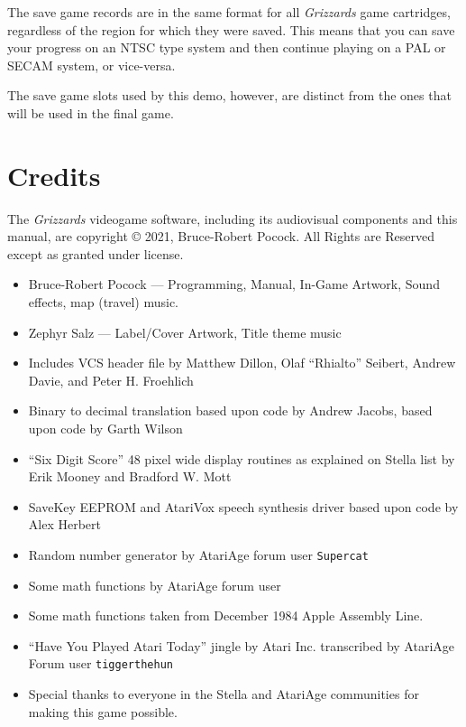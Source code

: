\documentclass[10pt,twocolumn,openany,article]{memoir}
\begin{document}
\begin{description}
The save game records are in the same format for all \textit{Grizzards} game
cartridges, regardless of the region for which they were saved.  This means
that you can save your progress on an NTSC type system and then continue
playing on a PAL or SECAM system, or vice-versa.

\ifdefined\DEMO

The save  game slots used by  this demo, however, are  distinct from the
ones that will be used in the final game.

\fi

\chapter{Credits}

The  \textit{Grizzards} videogame  software,  including its  audiovisual
components   and  this   manual,   are   copyright  \copyright{}   2021,
Bruce-Robert  Pocock.   All  Rights  are  Reserved   except  as  granted
under license.

\begin{itemize}
\item Bruce-Robert  Pocock --- Programming, Manual,  In-Game Artwork,
  Sound effects, map (travel) music.
\item Zephyr Salz --- Label/Cover Artwork, Title theme music
\end{itemize}

\bigskip

\begin{itemize}
\item  Includes VCS  header  file by  Matthew  Dillon, Olaf  ``Rhialto''
  Seibert, Andrew Davie, and Peter H. Froehlich
\item Binary  to decimal translation  based upon code by  Andrew Jacobs,
  based upon code by Garth Wilson
\item ``Six Digit Score'' 48 pixel wide display routines as explained on
  Stella list by Erik Mooney and Bradford W. Mott
\item SaveKey  EEPROM and  AtariVox speech  synthesis driver  based upon
  code by Alex Herbert
\item Random number generator by AtariAge forum user \texttt{Supercat}
\item Some math functions by AtariAge forum user 
\item Some math functions taken from December 1984 Apple Assembly Line.
\item   ``Have  You   Played  Atari   Today''  jingle   by  Atari   Inc.
  transcribed by AtariAge Forum user \texttt{tiggerthehun}
\item Special thanks to everyone  in the Stella and AtariAge communities
  for making this game possible.


\end{itemize}
\end{description}
\end{document}
